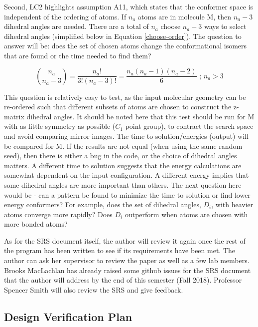 \documentclass[12pt, titlepage]{article}
\begin{document}
Second, LC2 highlights assumption A11, which states that the conformer space is 
independent of the ordering of atoms. If $n_a$ atoms are in molecule M, then 
$n_a-3$ dihedral angles are needed. There are a total of $n_a$ choose $n_a-3$ 
ways to select dihedral angles (simplified below in Equation 
\ref{choose-order}). The question to answer will be: does the set of chosen 
atoms change the conformational isomers that are found or the time needed to 
find them?

\begin{equation} \label{choose-order}
\binom{n_a}{n_a-3} = \frac{n_a!}{3!(n_a-3)!} = \frac{n_a(n_a-1)(n_a-2)}{6} 
\text{ ; } n_a > 3
\end{equation}

This question is relatively easy to test, as the input molecular geometry can 
be re-ordered such that different subsets of atoms are chosen to construct the 
z-matrix dihedral angles. It should be noted here that this test should be run 
for M with as little symmetry as possible ($C_1$ point group), to contract the 
search space and avoid comparing mirror images. The time to solution/energies 
(output) will be compared for M. If the results are not equal (when using the 
same random seed), then there is either a bug in the code, or the choice of 
dihedral angles matters. A different time to solution suggests that the energy 
calculations are somewhat dependent on the input configuration. A different 
energy implies that some dihedral angles are more important than others. The 
next question here would be - can a pattern be found to minimize the time to 
solution or find lower energy conformers? For example, does the set of dihedral 
angles, $D_i$, with heavier atoms converge more rapidly? Does $D_i$ outperform 
when atoms are chosen with more bonded atoms?

As for the SRS document itself, the author will review it again once the rest 
of the program has been written to see if its requirements have been met. The 
author can ask her supervisor to review the paper as well as a few lab members. 
Brooks MacLachlan has already raised some github issues for the SRS document 
that the author will address by the end of this semester (Fall 2018). Professor 
Spencer Smith will also review the SRS and give feedback.

\subsection{Design Verification Plan}
\end{document}
